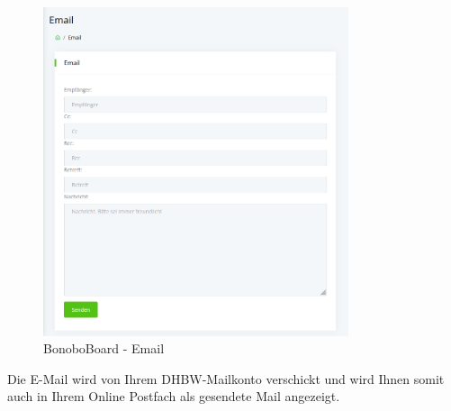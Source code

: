 \documentclass[a4paper,11pt]{scrartcl}
\begin{document}
\begin{figure}[H]
	\begin{center}
		\includegraphics[width=0.8\textwidth]{Mail}
		\caption{BonoboBoard - Email}
		\label{img:mail}
	\end{center}
\end{figure}
\noindent

Die E-Mail wird von Ihrem DHBW-Mailkonto verschickt und wird Ihnen somit auch in Ihrem Online Postfach als gesendete Mail angezeigt.

\end{document}

